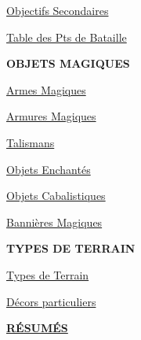 \begin{framed}
\begin{multicols}{3}
\vspace*{5pt}
{\setlength\parskip{0pt}
\hyperlink{secondaryobjectives}{Objectifs Secondaires}\hfill\pageref{secondary_objectives}

\hyperlink{victorypointstable}{Table des Pts de Bataille}\hfill\pageref{victory_points_table}}

\vspace*{\fill}
\columnbreak

\begin{center}\textbf{OBJETS MAGIQUES}\end{center}

\vspace*{5pt}
{\setlength\parskip{0pt}
\hyperlink{magicalweapons}{Armes Magiques}\hfill\pageref{magical_weapons}

\hyperlink{magicalarmour}{Armures Magiques}\hfill\pageref{magical_armour}

\hyperlink{talismans}{Talismans}\hfill\pageref{talismans}

\hyperlink{enchanteditems}{Objets Enchantés}\hfill\pageref{enchanted_items}

\hyperlink{arcaneitems}{Objets Cabalistiques}\hfill\pageref{arcane_items}

\hyperlink{magicalstandards}{Bannières Magiques}\hfill\pageref{magical_standards}}

\vspace*{5pt}
\begin{center}\textbf{TYPES DE TERRAIN}\end{center}

\vspace*{5pt}
{\setlength\parskip{0pt}
\hyperlink{terraintypes}{Types de Terrain}\hfill\pageref{terrain_types}

\hyperlink{terrainfeatures}{Décors particuliers}\hfill\pageref{terrain_features}}

\vspace*{\fill}

\begin{center}\hyperlink{summaries}{\textbf{RÉSUMÉS}}\end{center}

\end{multicols}
\setlength\columnseprule{0pt}
\vspace*{-10pt}
\end{framed}

\vspace*{10pt}
\begin{center}\end{center}
\vspace*{10pt}

